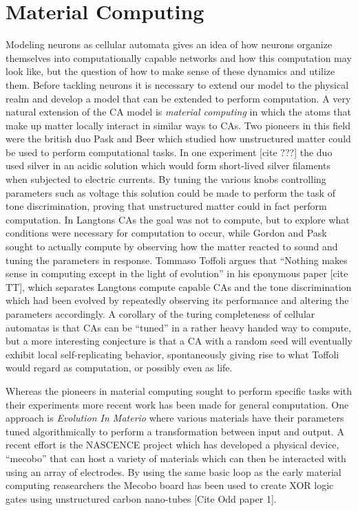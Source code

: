 \section{Material Computing}
Modeling neurons as cellular automata gives an idea of how neurons organize
themselves into computationally capable networks and how this computation may
look like, but the question of how to make sense of these dynamics and utilize
them.
Before tackling neurons it is necessary to extend our model to the physical
realm and develop a model that can be extended to perform computation.
A very natural extension of the CA model is \emph{material computing} in which
the atoms that make up matter locally interact in similar ways to CAs.
%
Two pioneers in this field were the british duo Pask and Beer which studied how
unstructured matter could be used to perform computational tasks.
%
In one experiment [cite ???] the duo used silver in an acidic solution which
would form short-lived silver filaments when subjected to electric currents.
%
By tuning the various knobs controlling parameters such as voltage this solution
could be made to perform the task of tone discrimination, proving that
unstructured matter could in fact perform computation.
%
In Langtons CAs the goal was not to compute, but to explore what conditions were
necessary for computation to occur, while Gordon and Pask sought to actually
compute by observing how the matter reacted to sound and tuning the parameters
in response.
%
Tommaso Toffoli argues that ``Nothing makes sense in computing except in the
light of evolution'' in his eponymous paper [cite TT], which separates Langtons
compute capable CAs and the tone discrimination which had been evolved by
repeatedly observing its performance and altering the parameters accordingly.
%
A corollary of the turing completeness of cellular automatas is that CAs can be
``tuned'' in a rather heavy handed way to compute, but a more interesting
conjecture is that a CA with a random seed will eventually exhibit local
self-replicating behavior, spontaneously giving rise to what Toffoli would
regard as computation, or possibly even as life.\par
%
Whereas the pioneers in material computing sought to perform specific tasks with
their experiments more recent work has been made for general computation.
One approach is \emph{Evolution In Materio} where various materials have their
parameters tuned algorithmically to perform a transformation between input and
output.
A recent effort is the NASCENCE project which has developed a physical device,
``mecobo'' that can host a variety of materials which can then be interacted
with using an array of electrodes.
By using the same basic loop as the early material computing reasearchers the
Mecobo board has been used to create XOR logic gates using unstructured carbon
nano-tubes [Cite Odd paper 1].
%
